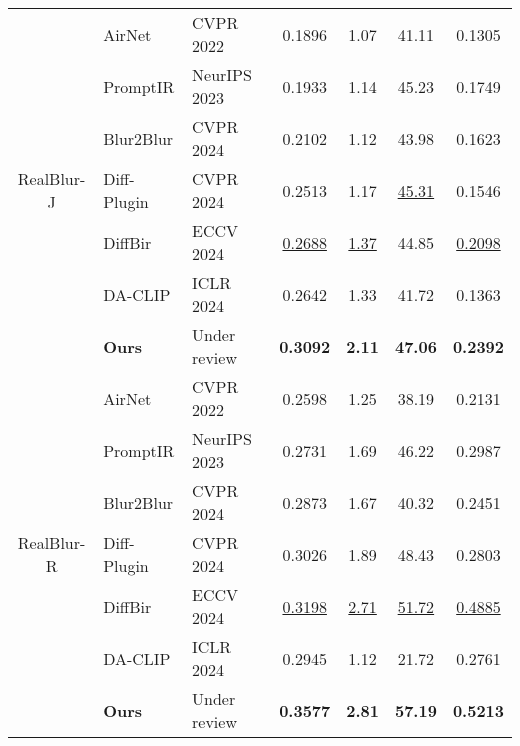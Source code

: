 \begin{table}[!t]
{\begin{tabular}{cllcccc}
\midrule
\multirow{7}{*}{RealBlur-J}
&AirNet   & CVPR 2022&  0.1896  & 1.07          & 41.11          & 0.1305                \\
&PromptIR     & NeurIPS 2023& 0.1933 & 1.14          & 45.23          & 0.1749                \\
&Blur2Blur  & CVPR 2024&  0.2102  &     1.12   &    43.98       &    0.1623     \\
&Diff-Plugin & CVPR 2024 & 0.2513  & 1.17          & \uline{45.31}          & 0.1546        \\
&DiffBir    & ECCV 2024 &  \uline{0.2688} & \uline{1.37}          & 44.85          & \uline{0.2098}                \\
&DA-CLIP    & ICLR 2024& 0.2642   & 1.33          & 41.72          & 0.1363                \\
&\cellcolor[HTML]{E6F0E8}\textbf{Ours}  & \cellcolor[HTML]{E6F0E8}Under review & \cellcolor[HTML]{E6F0E8}\textbf{0.3092} &\cellcolor[HTML]{E6F0E8}\textbf{2.11} & \cellcolor[HTML]{E6F0E8}\textbf{47.06} & \cellcolor[HTML]{E6F0E8}\textbf{0.2392}       \\
\midrule
\multirow{7}{*}{RealBlur-R}
&AirNet   & CVPR 2022 &  0.2598 & 1.25  & 38.19          & 0.2131                \\
&PromptIR     & NeurIPS 2023 & 0.2731 & 1.69          & 46.22          & 0.2987                \\
&Blur2Blur  & CVPR 2024  & 0.2873 &  1.67     &  40.32    &      0.2451   \\
&Diff-Plugin & CVPR 2024 &  0.3026 & 1.89          & 48.43          & 0.2803                \\
&DiffBir    & ECCV 2024 & \uline{0.3198}  & \uline{2.71}          & \uline{51.72}          & \uline{0.4885}                \\
&DA-CLIP    & ICLR 2024  &0.2945 & 1.12          & 21.72          & 0.2761                 \\
&\cellcolor[HTML]{E6F0E8}\textbf{Ours}       & \cellcolor[HTML]{E6F0E8}Under review & \cellcolor[HTML]{E6F0E8}\textbf{0.3577} & \cellcolor[HTML]{E6F0E8}\textbf{2.81} & \cellcolor[HTML]{E6F0E8}\textbf{57.19} & \cellcolor[HTML]{E6F0E8}\textbf{0.5213} \\
\bottomrule
\end{tabular}}
\end{table}